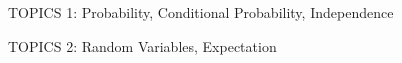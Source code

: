 \documentclass[handout]{mcs}
\begin{document}
\renewcommand{\reading}{
  Notes Ch.\bref{probability_chap}, \textbf{skipping}
  \S\S\bref{cond_ident_subsec}--\bref{aposteriori_subsec},
  \S\bref{birthday_principle_sec}; also \textbf{skip} Ch.18; read
  Ch.\bref{ran_var_examples_sec} \&~\bref{distributions_sec}.}



\begin{staffnotes}
TOPICS 1: Probability, Conditional Probability, Independence 
\end{staffnotes}

\begin{staffnotes}
TOPICS 2: Random Variables, Expectation 
\end{staffnotes} 

\end{document}

